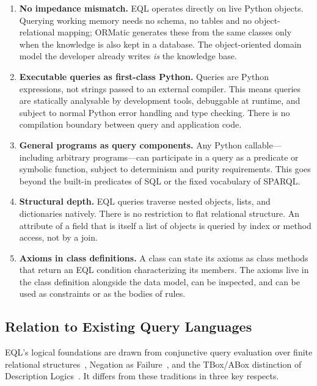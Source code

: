 \documentclass[11pt, a4paper]{article}
\theoremstyle{plain}
\theoremstyle{definition}
\theoremstyle{remark}
\begin{document}
\begin{enumerate}
  \item \textbf{No impedance mismatch.}  EQL operates directly on live Python objects.
        Querying working memory needs no schema, no tables and no object-relational mapping; ORMatic
        generates these from the same classes only when the knowledge is also kept in a database.  The
        object-oriented domain model the developer already writes \emph{is} the knowledge base.

  \item \textbf{Executable queries as first-class Python.}  Queries are Python expressions, not
        strings passed to an external compiler.  This means queries are statically analysable
        by development tools, debuggable at runtime, and subject to normal Python error
        handling and type checking.  There is no compilation boundary between query and
        application code.

  \item \textbf{General programs as query components.}  Any Python callable---including
        arbitrary programs---can participate in a query as a predicate or symbolic function,
        subject to determinism and purity requirements.  This goes beyond the built-in
        predicates of SQL or the fixed vocabulary of SPARQL.

  \item \textbf{Structural depth.}  EQL queries traverse nested objects, lists, and
        dictionaries natively.  There is no restriction to flat relational structure.  An
        attribute of a field that is itself a list of objects is queried by index or method
        access, not by a join.

  \item \textbf{Axioms in class definitions.}  A class can state its axioms as class methods
        that return an EQL condition characterizing its members.  The axioms live in the class
        definition alongside the data model, can be inspected, and can be used as constraints or
        as the bodies of rules.
\end{enumerate}

\subsection{Relation to Existing Query Languages}

EQL's logical foundations are drawn from conjunctive query evaluation over finite relational
structures~\cite{chandra1977optimal,abiteboul1995foundations}, Negation as
Failure~\cite{clark1978negation}, and the TBox/ABox distinction of Description
Logics~\cite{baader2003description}.  It differs from these traditions in three key respects.
\end{document}
